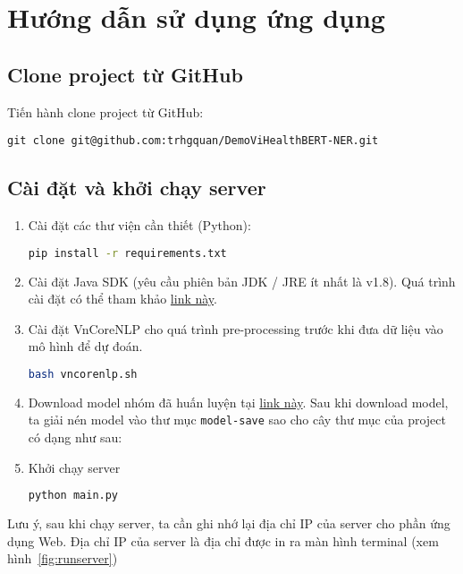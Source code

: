 \section{Hướng dẫn sử dụng ứng dụng}
\subsection{Clone project từ GitHub}
Tiến hành clone project từ GitHub:
\begin{lstlisting}
git clone git@github.com:trhgquan/DemoViHealthBERT-NER.git
\end{lstlisting}

\subsection{Cài đặt và khởi chạy server}
\begin{enumerate}
\item Cài đặt các thư viện cần thiết (Python):
\lstset{style=mystyle}
\begin{lstlisting}[language=bash]
pip install -r requirements.txt
\end{lstlisting}

\item Cài đặt Java SDK (yêu cầu phiên bản JDK / JRE ít nhất là v1.8). Quá trình cài đặt có thể tham khảo \href{https://www.oracle.com/java/technologies/downloads/}{link này}.

\item Cài đặt VnCoreNLP cho quá trình pre-processing trước khi đưa dữ liệu vào mô hình để dự đoán.

\lstset{style=mystyle}
\begin{lstlisting}[language=bash]
bash vncorenlp.sh
\end{lstlisting}

\item Download model nhóm đã huấn luyện tại  \href{https://drive.google.com/drive/u/2/folders/19AGLo-27EeuXDkKG2JstuCgrcwB0854r}{link này}. Sau khi download model, ta giải nén model vào thư mục \texttt{model-save} sao cho cây thư mục của project có dạng như sau:


\item Khởi chạy server
\lstset{style=mystyle}
\begin{lstlisting}[language=bash]
python main.py 
\end{lstlisting}
\end{enumerate}
Lưu ý, sau khi chạy server, ta cần ghi nhớ lại địa chỉ IP của server cho phần ứng dụng Web. Địa chỉ IP của server là địa chỉ được in ra màn hình terminal (xem hình~\ref{fig:runserver})

